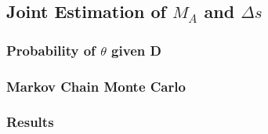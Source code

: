 \subsection{Joint Estimation of $M_A$ and $\Delta s$}\label{deltas}
  \subsubsection{Probability of $\theta$ given D}
  \subsubsection{Markov Chain Monte Carlo}
  \subsubsection{Results}

